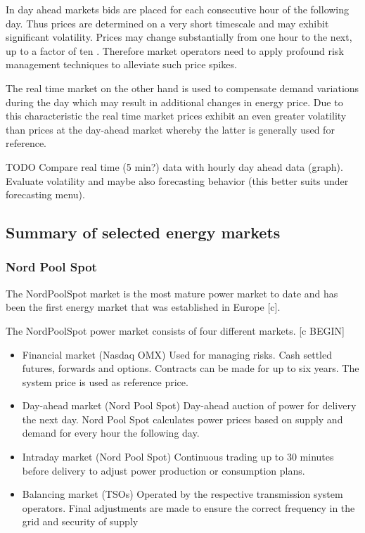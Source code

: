 In day ahead markets bids are placed for each consecutive hour of the following day. Thus prices are determined on a very short timescale and may exhibit significant volatility. Prices may change substantially from one hour to the next, up to a factor of ten \cite{huisman2007hourly}. Therefore market operators need to apply profound risk management techniques to alleviate such price spikes. 

The real time market on the other hand is used to compensate demand variations during the day which may result in additional changes in energy price. 
Due to this characteristic the real time market prices exhibit an even greater volatility than prices at the day-ahead market whereby the latter is generally used for reference. 

TODO Compare real time (5 min?) data with hourly day ahead data (graph). Evaluate volatility and maybe also forecasting behavior (this better suits under forecasting menu). 


\subsection{Summary of selected energy markets}



\subsubsection{Nord Pool Spot}


The NordPoolSpot market is the most mature power market to date and has been the first energy market that was established in Europe [c]. 

The NordPoolSpot power market consists of four different markets. [c BEGIN]

\begin{itemize}[-]

\item Financial market (Nasdaq OMX)
Used for managing risks. Cash settled futures,
forwards and options. Contracts can be made for
up to six years. The system price is used as
reference price.

\item Day-ahead market (Nord Pool Spot)
Day-ahead auction of power for delivery the next
day. Nord Pool Spot calculates power prices
based on supply and demand for every hour the
following day.

\item Intraday market (Nord Pool Spot)
Continuous trading up to 30 minutes before
delivery to adjust power production or
consumption plans.

\item Balancing market (TSOs)
Operated by the respective transmission system
operators. Final adjustments are made to ensure
the correct frequency in the grid and security of
supply

\end{itemize}

